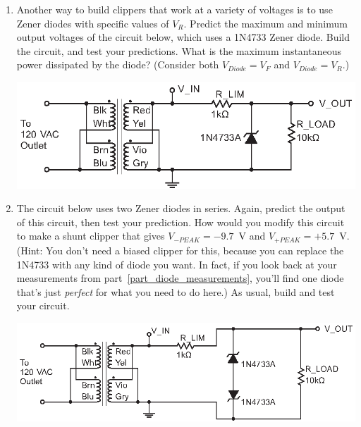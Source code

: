 \begin{enumerate}[wide]
\item Another way to build clippers that work at a variety of voltages is to use Zener diodes with specific values of $V_R$.  Predict the maximum and minimum output voltages of the circuit below, which uses a 1N4733 Zener diode.  Build the circuit, and test your predictions.  What is the maximum instantaneous power dissipated by the diode?  (Consider both $V_{Diode}=V_F$ and $V_{Diode}=V_R$.)  \label{part_zener_shunt_clipper}
\begin{center}
\includegraphics{diodes/zener_shunt_clipper.eps}
\end{center} 
 
\item The circuit below uses two Zener diodes in series.  Again, predict the output of this circuit, then test your prediction.  How would you modify this circuit to make a shunt clipper that gives $V_{-PEAK} = -9.7$~V and $V_{+PEAK} = +5.7$~V.   (Hint: You don't need a biased clipper for this, because you can replace the 1N4733 with any kind of diode you want.  In fact, if you look back at your measurements from part~\ref{part_diode_measurements}, you'll find one diode that's just \textit{perfect} for what you need to do here.)  As usual, build and test your circuit.
\begin{center}
\includegraphics{diodes/double_zener_shunt_clipper.eps}
\end{center} 
 
\end{enumerate}



